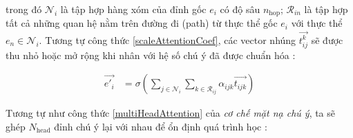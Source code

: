 %
%
%
%
%

trong đó $\mathcal{N}_i$ là tập hợp hàng xóm của đỉnh gốc $e_i$ có độ sâu $n_{\text{hop}}$; $\mathcal{R_{\textit{i} \textit{n}}}$ là tập hợp tất cả những quan hệ nằm trên đường đi (path) từ thực thể gốc $e_i$ với thực thể $e_n \in \mathcal{N}_i$. Tương tự công thức \ref{scaleAttentionCoef}, các vector nhúng $\overrightarrow{t^k_{ij}}$ sẽ được thu nhỏ hoặc mở rộng khi nhân với hệ số chú ý đã được chuẩn hóa :

\begin{align}
{\overrightarrow{e'_{i}}}&={\sigma\left(\sum_{j \in \mathcal{N}_i} \sum_{k \in \mathcal{R}_{ij}} \alpha_{ijk} \overrightarrow{t_{ijk}}\right)}
\end{align}

Tương tự như công thức \ref{multiHeadAttention} của \textit{cơ chế mặt nạ chú ý}, ta sẽ ghép $N_{\text{head}}$ đỉnh chú ý lại với nhau để ổn định quá trình học :

